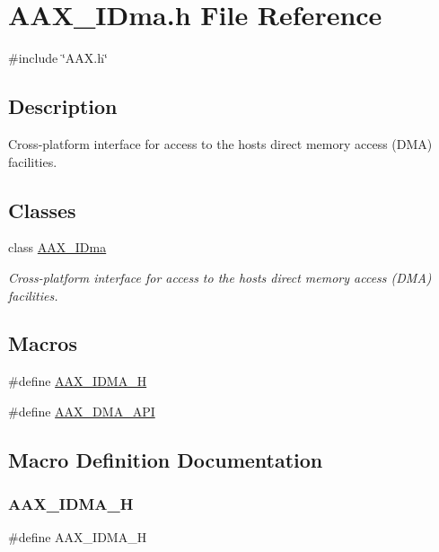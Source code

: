 \hypertarget{a00587}{}\section{A\+A\+X\+\_\+\+I\+Dma.\+h File Reference}
\label{a00587}
{\ttfamily \#include \char`\"{}A\+A\+X.\+h\char`\"{}}\newline


\subsection{Description}
Cross-\/platform interface for access to the host\textquotesingle{}s direct memory access (D\+MA) facilities. 

\subsection*{Classes}
\begin{DoxyCompactItemize}
\item 
class \mbox{\hyperlink{a01809}{A\+A\+X\+\_\+\+I\+Dma}}
\begin{DoxyCompactList}\small\item\em Cross-\/platform interface for access to the host\textquotesingle{}s direct memory access (D\+MA) facilities. \end{DoxyCompactList}\end{DoxyCompactItemize}
\subsection*{Macros}
\begin{DoxyCompactItemize}
\item 
\#define \mbox{\hyperlink{a00587_a429fd1cdbaca575330b0ebbe5de8f886}{A\+A\+X\+\_\+\+I\+D\+M\+A\+\_\+H}}
\item 
\#define \mbox{\hyperlink{a00587_acae60d01e5e4bd3282369d0d9d378f3f}{A\+A\+X\+\_\+\+D\+M\+A\+\_\+\+A\+PI}}
\end{DoxyCompactItemize}


\subsection{Macro Definition Documentation}
\mbox{\label{a00587_a429fd1cdbaca575330b0ebbe5de8f886}} 
\subsubsection{\texorpdfstring{AAX\_IDMA\_H}{AAX\_IDMA\_H}}
{\footnotesize\ttfamily \#define A\+A\+X\+\_\+\+I\+D\+M\+A\+\_\+H}

